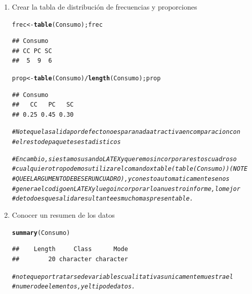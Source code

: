 \documentclass[12pt,letterpaper]{article}\usepackage[]{graphicx}\usepackage[]{color}
\makeatletter
\newcommand{\hlcom}[1]{\textcolor[rgb]{0.678,0.584,0.686}{\textit{#1}}}%
\newcommand{\hlopt}[1]{\textcolor[rgb]{0,0,0}{#1}}%
\newcommand{\hlstd}[1]{\textcolor[rgb]{0.345,0.345,0.345}{#1}}%
\newcommand{\hlkwb}[1]{\textcolor[rgb]{0.69,0.353,0.396}{#1}}%
\newcommand{\hlkwd}[1]{\textcolor[rgb]{0.737,0.353,0.396}{\textbf{#1}}}%
\newenvironment{kframe}{%
 \def\at@end@of@kframe{}%
 \ifinner\ifhmode%
  \def\at@end@of@kframe{\end{minipage}}%
  \begin{minipage}{\columnwidth}%
 \fi\fi%
 \def\FrameCommand##1{\hskip\@totalleftmargin \hskip-\fboxsep
 \colorbox{shadecolor}{##1}\hskip-\fboxsep
     \hskip-\linewidth \hskip-\@totalleftmargin \hskip\columnwidth}%
 \MakeFramed {\advance\hsize-\width
   \@totalleftmargin\z@ \linewidth\hsize
   \@setminipage}}%
 {\par\unskip\endMakeFramed%
 \at@end@of@kframe}
\newenvironment{knitrout}{}{} %
\makeatother
\begin{document}
\begin{enumerate}
\item  Crear la tabla de distribuci\'on de frecuencias y proporciones
\begin{knitrout}
\color{fgcolor}\begin{kframe}
\begin{alltt}
\hlstd{frec} \hlkwb{<-} \hlkwd{table}\hlstd{(Consumo); frec}
\end{alltt}
\begin{verbatim}
## Consumo
## CC PC SC 
##  5  9  6
\end{verbatim}
\begin{alltt}
\hlstd{prop} \hlkwb{<-} \hlkwd{table}\hlstd{(Consumo)}\hlopt{/}\hlkwd{length}\hlstd{(Consumo); prop}
\end{alltt}
\begin{verbatim}
## Consumo
##   CC   PC   SC 
## 0.25 0.45 0.30
\end{verbatim}
\begin{alltt}
\hlcom{# Note que la salida por defecto no es para nada atractiva en comparacion con }
\hlcom{# el resto de paquetes estadisticos }
\end{alltt}
\end{kframe}
\end{knitrout}
\begin{knitrout}
\color{fgcolor}\begin{kframe}
\begin{alltt}
\hlcom{# En cambio, si estamos usando LATEX y queremos incorporar estos cuadros o}
\hlcom{# cualquier otro podemos utilizar el comando xtable(table(Consumo)) (NOTE }
\hlcom{# QUE EL ARGUMENTO DEBE SER UN CUADRO), y con esto automaticamente se nos }
\hlcom{# genera el codigo en LATEX y luego incorporarlo a nuestro informe, lo mejor}
\hlcom{# de todo es que salida resultante es mucho mas presentable. }
\end{alltt}
\end{kframe}
\end{knitrout}

\item  Conocer un resumen de los datos 
\begin{knitrout}
\color{fgcolor}\begin{kframe}
\begin{alltt}
\hlkwd{summary}\hlstd{(Consumo)}
\end{alltt}
\begin{verbatim}
##    Length     Class      Mode 
##        20 character character
\end{verbatim}
\begin{alltt}
\hlcom{# note que por tratarse de variables cualitativas unicamente muestra el }
\hlcom{# numero de elementos, y el tipo de datos. }
\end{alltt}
\end{kframe}
\end{knitrout}


\end{enumerate}
\end{document}
